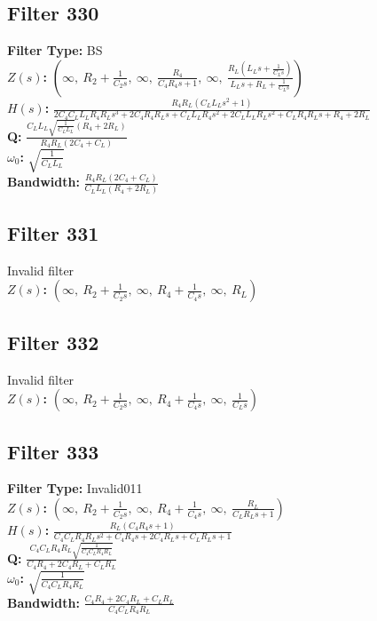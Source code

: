 \documentclass{article}
\begin{document}
\subsection*{Filter 330}
\textbf{Filter Type:} BS \\ 
\textbf{$Z(s)$:} $\left( \infty, \  R_{2} + \frac{1}{C_{2} s}, \  \infty, \  \frac{R_{4}}{C_{4} R_{4} s + 1}, \  \infty, \  \frac{R_{L} \left(L_{L} s + \frac{1}{C_{L} s}\right)}{L_{L} s + R_{L} + \frac{1}{C_{L} s}}\right)$ \\ 
\textbf{$H(s)$:} $\frac{R_{4} R_{L} \left(C_{L} L_{L} s^{2} + 1\right)}{2 C_{4} C_{L} L_{L} R_{4} R_{L} s^{3} + 2 C_{4} R_{4} R_{L} s + C_{L} L_{L} R_{4} s^{2} + 2 C_{L} L_{L} R_{L} s^{2} + C_{L} R_{4} R_{L} s + R_{4} + 2 R_{L}}$ \\ 
\textbf{Q:} $\frac{C_{L} L_{L} \sqrt{\frac{1}{C_{L} L_{L}}} \left(R_{4} + 2 R_{L}\right)}{R_{4} R_{L} \left(2 C_{4} + C_{L}\right)}$ \\ 
\textbf{$\omega_0$:} $\sqrt{\frac{1}{C_{L} L_{L}}}$ \\ 
\textbf{Bandwidth:} $\frac{R_{4} R_{L} \left(2 C_{4} + C_{L}\right)}{C_{L} L_{L} \left(R_{4} + 2 R_{L}\right)}$ \\ 
\subsection*{Filter 331}
Invalid filter \\ 
\textbf{$Z(s)$:} $\left( \infty, \  R_{2} + \frac{1}{C_{2} s}, \  \infty, \  R_{4} + \frac{1}{C_{4} s}, \  \infty, \  R_{L}\right)$ \\ 
\subsection*{Filter 332}
Invalid filter \\ 
\textbf{$Z(s)$:} $\left( \infty, \  R_{2} + \frac{1}{C_{2} s}, \  \infty, \  R_{4} + \frac{1}{C_{4} s}, \  \infty, \  \frac{1}{C_{L} s}\right)$ \\ 
\subsection*{Filter 333}
\textbf{Filter Type:} Invalid011 \\ 
\textbf{$Z(s)$:} $\left( \infty, \  R_{2} + \frac{1}{C_{2} s}, \  \infty, \  R_{4} + \frac{1}{C_{4} s}, \  \infty, \  \frac{R_{L}}{C_{L} R_{L} s + 1}\right)$ \\ 
\textbf{$H(s)$:} $\frac{R_{L} \left(C_{4} R_{4} s + 1\right)}{C_{4} C_{L} R_{4} R_{L} s^{2} + C_{4} R_{4} s + 2 C_{4} R_{L} s + C_{L} R_{L} s + 1}$ \\ 
\textbf{Q:} $\frac{C_{4} C_{L} R_{4} R_{L} \sqrt{\frac{1}{C_{4} C_{L} R_{4} R_{L}}}}{C_{4} R_{4} + 2 C_{4} R_{L} + C_{L} R_{L}}$ \\ 
\textbf{$\omega_0$:} $\sqrt{\frac{1}{C_{4} C_{L} R_{4} R_{L}}}$ \\ 
\textbf{Bandwidth:} $\frac{C_{4} R_{4} + 2 C_{4} R_{L} + C_{L} R_{L}}{C_{4} C_{L} R_{4} R_{L}}$ \\ 
\end{document}
